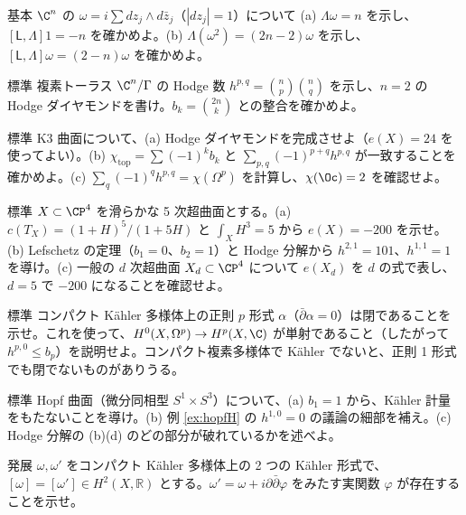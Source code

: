 \begin{prob}{基本}\label{p:LLam}
$\C^n$ の $\omega=i\sum dz_j\wedge d\bar z_j$（$|dz_j|=1$）について (a) $\Lambda\omega=n$ を示し、$[\mathsf L,\Lambda]1=-n$ を確かめよ。(b) $\Lambda(\omega^2)=(2n-2)\omega$ を示し、$[\mathsf L,\Lambda]\omega=(2-n)\omega$ を確かめよ。
\end{prob}
\begin{prob}{標準}\label{p:torusH}
複素トーラス $\C^n/\Gamma$ の Hodge 数 $h^{p,q}=\binom np\binom nq$ を示し、$n=2$ の Hodge ダイヤモンドを書け。$b_k=\binom{2n}k$ との整合を確かめよ。
\end{prob}
\begin{prob}{標準}\label{p:K3}
K3 曲面について、(a) Hodge ダイヤモンドを完成させよ（$e(X)=24$ を使ってよい）。(b) $\chi_{\mathrm{top}}=\sum(-1)^kb_k$ と $\sum_{p,q}(-1)^{p+q}h^{p,q}$ が一致することを確かめよ。(c) $\sum_q(-1)^qh^{p,q}=\chi(\Omega^p)$ を計算し、$\chi(\Oc)=2$ を確認せよ。
\end{prob}
\begin{prob}{標準}\label{p:quintic}
$X\subset\CP^4$ を滑らかな 5 次超曲面とする。(a) $c(T_X)=(1+H)^5/(1+5H)$ と $\int_XH^3=5$ から $e(X)=-200$ を示せ。(b) Lefschetz の定理（$b_1=0$、$b_2=1$）と Hodge 分解から $h^{2,1}=101$、$h^{1,1}=1$ を導け。(c) 一般の $d$ 次超曲面 $X_d\subset\CP^4$ について $e(X_d)$ を $d$ の式で表し、$d=5$ で $-200$ になることを確認せよ。
\end{prob}
\begin{prob}{標準}\label{p:holclosed}
コンパクト Kähler 多様体上の正則 $p$ 形式 $\alpha$（$\bar\partial\alpha=0$）は閉であることを示せ。これを使って、$H^0(X,\Omega^p)\to H^p(X,\C)$ が単射であること（したがって $h^{p,0}\le b_p$）を説明せよ。コンパクト複素多様体で Kähler でないと、正則 1 形式でも閉でないものがありうる。
\end{prob}
\begin{prob}{標準}\label{p:hopfH}
Hopf 曲面（微分同相型 $S^1\times S^3$）について、(a) $b_1=1$ から、Kähler 計量をもたないことを導け。(b) 例 \ref{ex:hopfH} の $h^{1,0}=0$ の議論の細部を補え。(c) Hodge 分解の (b)(d) のどの部分が破れているかを述べよ。
\end{prob}
\begin{prob}{発展}\label{p:ddbar}
$\omega,\omega'$ をコンパクト Kähler 多様体上の 2 つの Kähler 形式で、$[\omega]=[\omega']\in H^2(X,\mathbb R)$ とする。$\omega'=\omega+i\partial\bar\partial\varphi$ をみたす実関数 $\varphi$ が存在することを示せ。
\end{prob}

